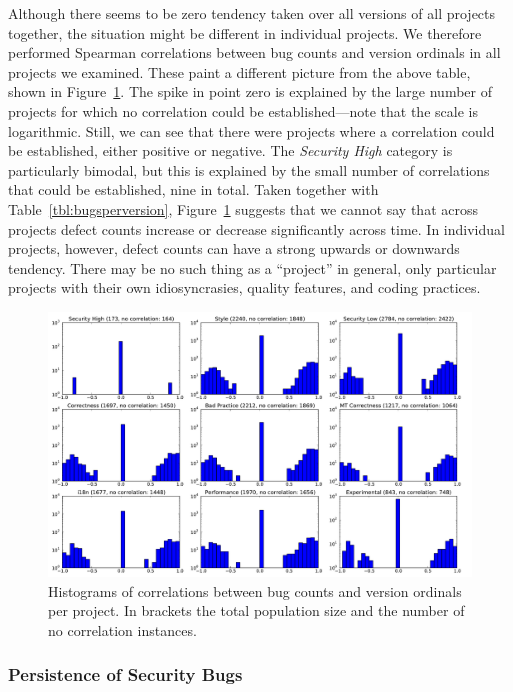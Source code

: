 \documentclass[conference]{llncs}
\begin{document}
Although there seems to be zero tendency taken over all versions of
all projects together, the situation might be different in individual
projects. We therefore performed Spearman correlations between bug
counts and version ordinals in all projects we examined. These paint a
different picture from the above table, shown in
Figure~\ref{fig:bugsversionscorr}. The spike in point zero is
explained by the large number of projects for which no correlation
could be established---note that the scale is logarithmic. Still, we
can see that there were projects where a correlation could be
established, either positive or negative. The {\it Security High}
category is particularly bimodal, but this is explained by the small
number of correlations that could be established, nine in total. Taken
together with Table~\ref{tbl:bugsperversion},
Figure~\ref{fig:bugsversionscorr} suggests that we cannot say that across
projects defect counts increase or decrease significantly across time.
In individual projects, however, defect counts can have a strong
upwards or downwards tendency. There may be no such thing as a
``project'' in general, only particular projects with their own
idiosyncrasies, quality features, and coding practices.

\begin{figure}
  \centering
  \includegraphics[scale=0.4]{bugsversionscorr}
  \caption{Histograms of correlations between bug counts and version
    ordinals per project. In brackets the total population size and
    the number of no correlation instances.}
  \label{fig:bugsversionscorr}
\end{figure}

\subsubsection{Persistence of Security Bugs}
\end{document}
